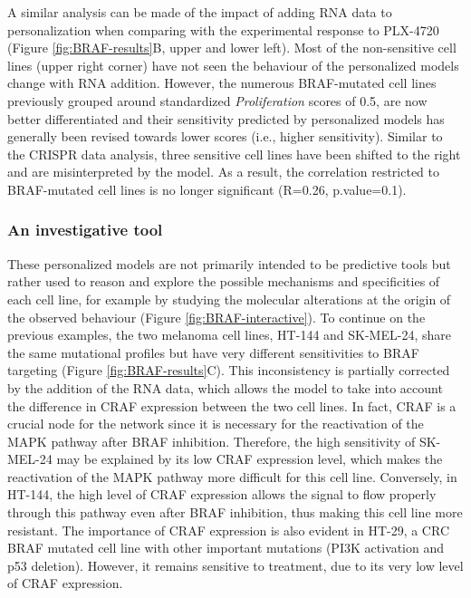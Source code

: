 \documentclass[a4paper,12pt,twoside,onecolumn,openright,final,oldfontcommands]{memoir}
\begin{document}
A similar analysis can be made of the impact of adding RNA data to
personalization when comparing with the experimental response to
PLX-4720 (Figure \ref{fig:BRAF-results}B, upper and lower left). Most of
the non-sensitive cell lines (upper right corner) have not seen the
behaviour of the personalized models change with RNA addition. However,
the numerous BRAF-mutated cell lines previously grouped around
standardized \emph{Proliferation} scores of 0.5, are now better
differentiated and their sensitivity predicted by personalized models
has generally been revised towards lower scores (i.e., higher
sensitivity). Similar to the CRISPR data analysis, three sensitive cell
lines have been shifted to the right and are misinterpreted by the
model. As a result, the correlation restricted to BRAF-mutated cell
lines is no longer significant (R=0.26, p.value=0.1).

\subsubsection{An investigative tool}\label{an-investigative-tool}

These personalized models are not primarily intended to be predictive
tools but rather used to reason and explore the possible mechanisms and
specificities of each cell line, for example by studying the molecular
alterations at the origin of the observed behaviour (Figure
\ref{fig:BRAF-interactive}). To continue on the previous examples, the
two melanoma cell lines, HT-144 and SK-MEL-24, share the same mutational
profiles but have very different sensitivities to BRAF targeting (Figure
\ref{fig:BRAF-results}C). This inconsistency is partially corrected by
the addition of the RNA data, which allows the model to take into
account the difference in CRAF expression between the two cell lines. In
fact, CRAF is a crucial node for the network since it is necessary for
the reactivation of the MAPK pathway after BRAF inhibition. Therefore,
the high sensitivity of SK-MEL-24 may be explained by its low CRAF
expression level, which makes the reactivation of the MAPK pathway more
difficult for this cell line. Conversely, in HT-144, the high level of
CRAF expression allows the signal to flow properly through this pathway
even after BRAF inhibition, thus making this cell line more resistant.
The importance of CRAF expression is also evident in HT-29, a CRC BRAF
mutated cell line with other important mutations (PI3K activation and
p53 deletion). However, it remains sensitive to treatment, due to its
very low level of CRAF expression.
\end{document}
